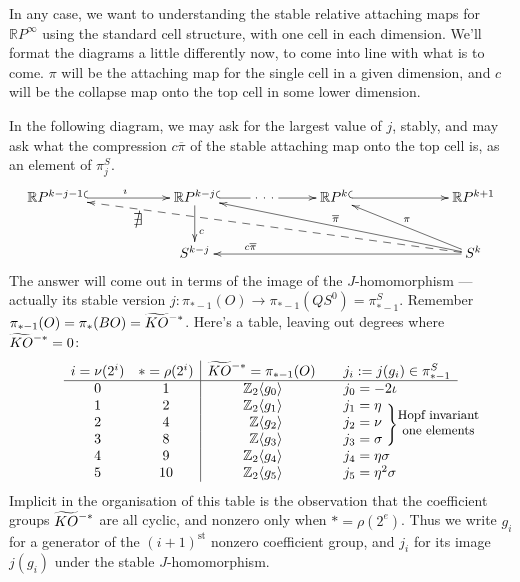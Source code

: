 \documentclass{article}
\newcommand{\Z}{\mathbb{Z}}
\newcommand{\R}{\mathbb{R}}
\newcommand{\RP}{\R P}
\renewcommand{\to}{\longrightarrow}
\theoremstyle{definition}
\begin{document}
In any case, we want to understanding the stable relative attaching maps for $\RP^\infty$ using the standard cell structure, with one cell in each dimension. We'll format the diagrams a little differently now, to come into line with what is to come. $\pi$ will be the attaching map for the single cell in a given dimension, and $c$ will be the collapse map onto the top cell in some lower dimension.

In the following diagram, we may ask for the largest value of $j$, stably, and may ask what the compression $c\overline\pi$ of the stable attaching map onto the top cell is, as an element of $\pi^S_j$.
\[\xymatrix@!0@C=3.5cm@R=1.4cm{
\RP^{k-j-1}\ar@{^{(}->}[r]^\imath &\ar[d]^(.6)c \RP^{k-j}\ar|{\ \cdot\ \cdot\ \cdot\ }@{^{(}->}[r]& \RP^k \ar@{^{(}->}[r] & \RP^{k+1}\\
&S^{k-j}&&\ar[ull]_{\overline\pi}\ar@{-->}[ulll]^(.8){\text{\large$\nexists$}}S^{k}\ar[ul]_\pi\ar[ll]_(.8){c\overline\pi}
}\]
The answer will come out in terms of the image of the $J$-homomorphism --- actually its stable version $j: \pi_{*-1}(O) \to \pi_{*-1}(QS^0) = \pi_{*-1}^S$.  Remember $\pi_{*-1}(O) = \pi_* (BO) = \widetilde{KO}\rule{0mm}{1.7ex}^{-*}$.  Here's a table, leaving out degrees where $\widetilde{KO}\rule{0mm}{1.7ex}^{-*} = 0$:
\[
\begin{array}{cc|ccl}
i=\nu(2^i) & *=\rho(2^i) & \widetilde{KO}\rule{0mm}{1.7ex}^{-*}=\pi_{*-1}(O) &&j_i:=j(g_i)\in\pi_{*-1}^S \\
\hline
0 & 1 & \makebox[1.05cm][r]{$\Z_2 \langle g_0\rangle$} && \makebox[1.4cm][l]{$j_0=-2 \iota$} \\
1 & 2 & \makebox[1.05cm][r]{$\Z_2 \langle g_1\rangle$} && \makebox[1.4cm][l]{$j_1=\eta $}\\
2 & 4 & \makebox[1.05cm][r]{$\Z \langle g_2\rangle$} && \makebox[1.4cm][l]{$j_2=\nu\ \makebox[0cm][l]{\raisebox{-.5mm}[0cm][0cm]{$\Biggr\}\raisebox{-1ex}{\text{\shortstack{\small Hopf invariant\\\small\small one elements}}}$}} $}\\
3 & 8 & \makebox[1.05cm][r]{$\Z \langle  g_3\rangle$} && \makebox[1.4cm][l]{$j_3=\sigma$} \\
4 & 9 & \makebox[1.05cm][r]{$\Z_2 \langle  g_4\rangle$} && \makebox[1.4cm][l]{$j_4=\eta \sigma$} \\
5 & 10 & \makebox[1.05cm][r]{$\Z_2 \langle  g_5\rangle$} && \makebox[1.4cm][l]{$j_5=\eta^2 \sigma$}
\end{array}
\]
Implicit in the organisation of this table is the observation that the coefficient groups $\widetilde{KO}\rule{0mm}{1.7ex}^{-*}$ are all cyclic, and nonzero only when $*=\rho(2^e)$. Thus we write $g_i$ for a generator of the $(i+1)^\text{st}$ nonzero coefficient group, and $j_i$ for its image $j(g_i)$ under the stable $J$-homomorphism.
\end{document}
